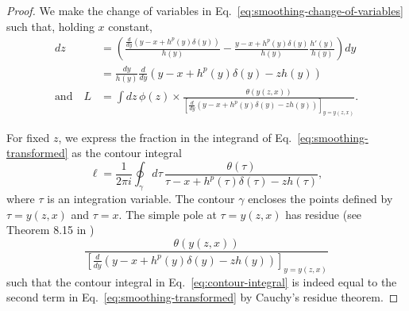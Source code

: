 \begin{proof}
We make the change of variables in Eq.~\eqref{eq:smoothing-change-of-variables} such that, holding $x$ constant, 
\begin{align}
dz & =\left(\frac{\frac{d}{dy}\left(y-x+h^{p}\left(y\right)\delta\left(y\right)\right)}{h\left(y\right)}-\frac{y-x+h^{p}\left(y\right)\delta\left(y\right)}{h\left(y\right)}\frac{h'\left(y\right)}{h\left(y\right)}\right)dy\nonumber \\
 & =\frac{dy}{h\left(y\right)}\frac{d}{dy}\left(y-x+h^{p}\left(y\right)\delta\left(y\right)-zh\left(y\right)\right)\nonumber \\
\text{and}\quad L & =\int dz\,\phi\left(z\right)\times\frac{\theta\left(y\left(z,x\right)\right)}{\left[\frac{d}{dy}\left(y-x+h^{p}\left(y\right)\delta\left(y\right)-zh\left(y\right)\right)\right]_{y=y\left(z,x\right)}}.\label{eq:smoothing-transformed}
\end{align}


For fixed $z$, we express the fraction in the integrand of Eq.~\eqref{eq:smoothing-transformed} as the contour integral 
\begin{equation}
\ell=\frac{1}{2\pi i}\oint_{\gamma}d\tau\,\frac{\theta\left(\tau\right)}{\tau-x+h^{p}\left(\tau\right)\delta\left(\tau\right)-zh\left(\tau\right)},\label{eq:contour-integral}
\end{equation}
where $\tau$ is an integration variable. The contour $\gamma$ encloses the points defined by $\tau=y\left(z,x\right)$ and $\tau=x$. The simple pole at $\tau=y\left(z,x\right)$ has residue (see Theorem 8.15 in \cite{Howie2008}) 
\[
\frac{\theta\left(y\left(z,x\right)\right)}{\left[\frac{d}{dy}\left(y-x+h^{p}\left(y\right)\delta\left(y\right)-zh\left(y\right)\right)\right]_{y=y\left(z,x\right)}}
\]
such that the contour integral in Eq.~\eqref{eq:contour-integral} is indeed equal to the second term in Eq.~\eqref{eq:smoothing-transformed} by Cauchy's residue theorem.


\end{proof}
